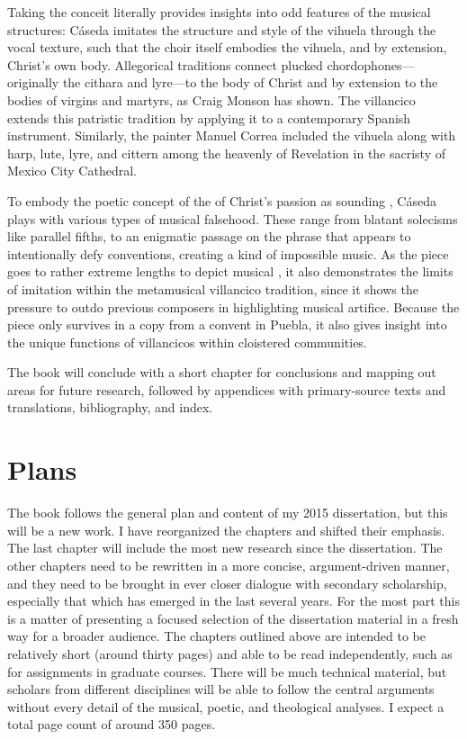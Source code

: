 \documentclass{vcbook-proposal}
\begin{document}
Taking the conceit literally provides insights into odd features of the musical 
structures: Cáseda imitates the structure and style of the vihuela through the 
vocal texture, such that the choir itself embodies the vihuela, and by 
extension, Christ's own body.
Allegorical traditions connect plucked chordophones---originally the cithara 
and lyre---to the body of Christ and by extension to the bodies of virgins and 
martyrs, as Craig Monson has shown.%
  \autocite{Monson:DivasConvent}
The villancico extends this patristic tradition by applying it to a 
contemporary Spanish instrument.
Similarly, the painter Manuel Correa included the vihuela along with harp, 
lute, lyre, and cittern among the heavenly  of 
Revelation in the sacristy of Mexico City Cathedral.

To embody the poetic concept of the  of Christ's passion as 
sounding , Cáseda plays with various types of musical falsehood.
These range from blatant solecisms like parallel fifths, to an enigmatic 
passage on the phrase  that appears to intentionally 
defy  conventions, creating a kind of impossible music.
As the piece goes to rather extreme lengths to depict musical 
, it also demonstrates the limits of imitation within the 
metamusical villancico tradition, since it shows the pressure to outdo previous 
composers in highlighting musical artifice.
Because the piece only survives in a copy from a convent in Puebla, it also 
gives insight into the unique functions of villancicos within cloistered 
communities.

The book will conclude with a short chapter for conclusions and mapping out
areas for future research, followed by appendices with primary-source texts and
translations, bibliography, and index.

\section{Plans}

The book follows the general plan and content of my 2015 dissertation, but this 
will be a new work.%
  \autocite{Cashner:PhD}
I have reorganized the chapters and shifted their emphasis.
The last chapter will include the most new research since the dissertation.
The other chapters need to be rewritten in a more concise, argument-driven 
manner, and they need to be brought in ever closer dialogue with secondary 
scholarship, especially that which has emerged in the last several years.
For the most part this is a matter of presenting a focused selection of the 
dissertation material in a fresh way for a broader audience.
The chapters outlined above are intended to be relatively short (around thirty 
pages) and able to be read independently, such as for assignments in graduate 
courses.
There will be much technical material, but scholars from different disciplines 
will be able to follow the central arguments without every detail of the 
musical, poetic, and theological analyses.
I expect a total page count of around 350 pages.
\end{document}
